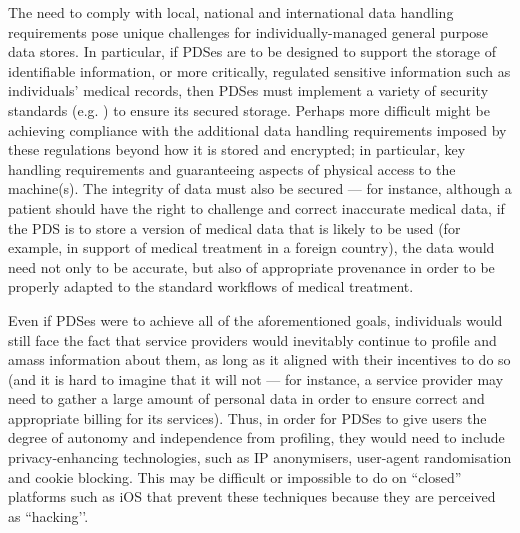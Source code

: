\documentclass[runningheads,a4paper]{llncs}
\begin{document}
The need to comply with local, national and international data handling requirements pose unique challenges for individually-managed general purpose data stores. In particular, if  PDSes are to be designed to support the storage of identifiable information, or more critically, regulated sensitive information such as individuals’ medical records, then PDSes must implement a variety of security standards (e.g. \cite{}) to ensure its secured storage.  Perhaps more difficult might be achieving compliance with the additional data handling requirements imposed by these regulations beyond how it is stored and encrypted; in particular, key handling requirements and guaranteeing aspects of physical access to the machine(s). The integrity of data must also be secured --- for instance, although a patient should have the right to challenge and correct inaccurate medical data, if the PDS is to store a version of medical data that is likely to be used (for example, in support of medical treatment in a foreign country), the data would need not only to be accurate, but also of appropriate provenance in order to be properly adapted to the standard workflows of medical treatment.

Even if PDSes were to achieve all of the aforementioned goals, individuals would still face the fact that service providers would inevitably continue to profile and amass information about them, as long as it aligned with their incentives to do so (and it is hard to imagine that it will not --- for instance, a service provider may need to gather a large amount of personal data in order to ensure correct and appropriate billing for its services).  Thus, in order for PDSes to give users the degree of autonomy and independence from profiling, they would need to include privacy-enhancing technologies, such as IP anonymisers, user-agent randomisation and cookie blocking. This may be difficult or impossible to do on “closed” platforms such as iOS that prevent these techniques because they are perceived as ``hacking’’.

\end{document}
